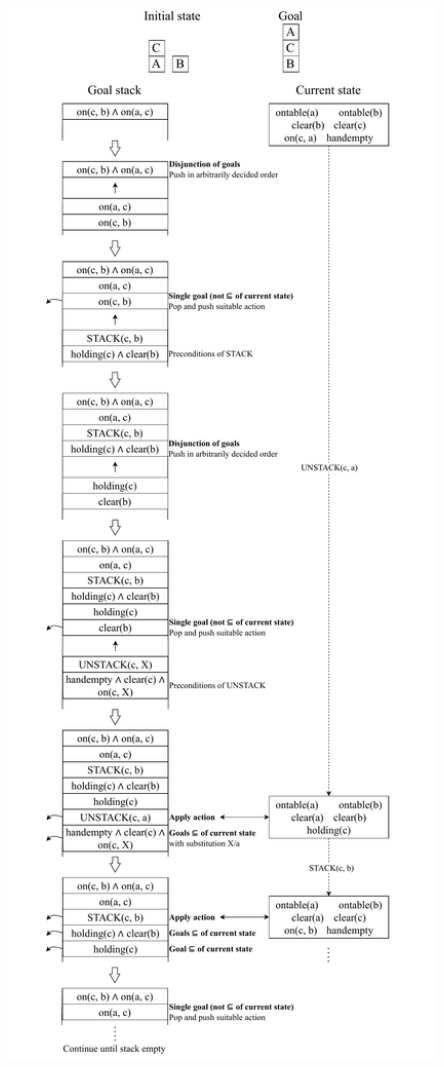\begin{example}
\begin{center}
    \end{center}
    \begin{center}
        \includegraphics[trim={0 0 0 17.5cm}, clip, width=0.85\textwidth]{img/_strips_example.pdf}
    \end{center}
\end{example}

